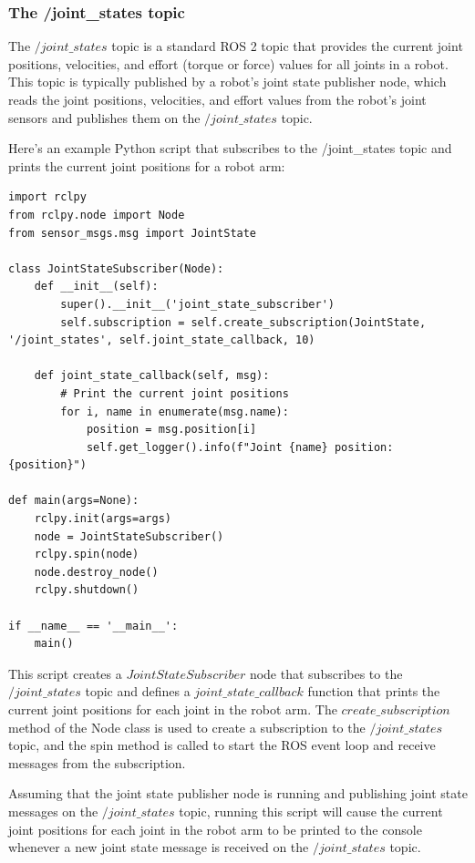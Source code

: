 \documentclass[12pt,oneside]{article}
\begin{document}
\subsubsection{The /joint\_states topic}\label{ros2-joint-state}
The $/joint\_states$ topic is a standard ROS 2 topic that provides the current joint positions, velocities, and effort (torque or force) values for all joints in a robot. This topic is typically published by a robot's joint state publisher node, which reads the joint positions, velocities, and effort values from the robot's joint sensors and publishes them on the $/joint\_states$ topic.

Here's an example Python script that subscribes to the /joint\_states topic and prints the current joint positions for a robot arm:
\begin{verbatim}
import rclpy
from rclpy.node import Node
from sensor_msgs.msg import JointState

class JointStateSubscriber(Node):
    def __init__(self):
        super().__init__('joint_state_subscriber')
        self.subscription = self.create_subscription(JointState, '/joint_states', self.joint_state_callback, 10)

    def joint_state_callback(self, msg):
        # Print the current joint positions
        for i, name in enumerate(msg.name):
            position = msg.position[i]
            self.get_logger().info(f"Joint {name} position: {position}")

def main(args=None):
    rclpy.init(args=args)
    node = JointStateSubscriber()
    rclpy.spin(node)
    node.destroy_node()
    rclpy.shutdown()

if __name__ == '__main__':
    main()
\end{verbatim}
This script creates a $JointStateSubscriber$ node that subscribes to the $/joint\_states$ topic and defines a $joint\_state\_callback$ function that prints the current joint positions for each joint in the robot arm. The $create\_subscription$ method of the Node class is used to create a subscription to the $/joint\_states$ topic, and the spin method is called to start the ROS event loop and receive messages from the subscription.

Assuming that the joint state publisher node is running and publishing joint state messages on the $/joint\_states$ topic, running this script will cause the current joint positions for each joint in the robot arm to be printed to the console whenever a new joint state message is received on the $/joint\_states$ topic.
\end{document}
